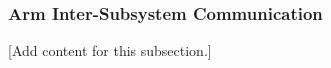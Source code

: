 
\subsubsection{Arm Inter-Subsystem Communication}
\label{subsubsec:design_2_5_6_arm_inter_subsystem_communication}

[Add content for this subsection.]
